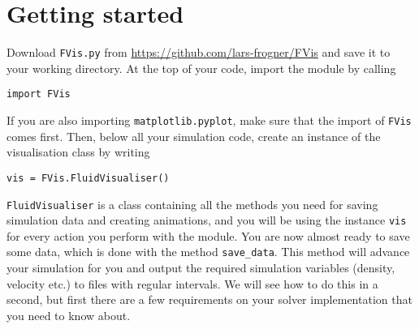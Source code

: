 \documentclass{article}
\newcommand{\ttt}[1]{\texttt{#1}}
\begin{document}
\section{Getting started}
\label{sec:start}
Download \ttt{FVis.py} from \url{https://github.com/lars-frogner/FVis} and save it to your working directory. At the top of your code, import the module by calling
\begin{lstlisting}
import FVis
\end{lstlisting}
If you are also importing \ttt{matplotlib.pyplot}, make sure that the import of \ttt{FVis} comes first. Then, below all your simulation code, create an instance of the visualisation class by writing
\begin{lstlisting}
vis = FVis.FluidVisualiser()
\end{lstlisting}
\ttt{FluidVisualiser} is a class containing all the methods you need for saving simulation data and creating animations, and you will be using the instance \ttt{vis} for every action you perform with the module. You are now almost ready to save some data, which is done with the method \ttt{save\_data}. This method will advance your simulation for you and output the required simulation variables (density, velocity etc.) to files with regular intervals. We will see how to do this in a second, but first there are a few requirements on your solver implementation that you need to know about.
\end{document}
